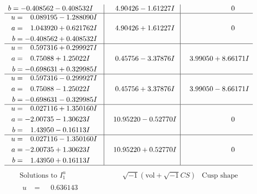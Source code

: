 \documentclass[1p]{elsarticle_modified}
\theoremstyle{definition}
\newcommand{\I}{\sqrt{-1}}
\begin{document}
$$\begin{array}{c|c|c}
\begin{aligned}
b &= -0.408562 - 0.408532 I\end{aligned}
 & \phantom{-}4.90426 - 1.61227 I & \phantom{-0.000000 } 0 \\ \hline\begin{aligned}
u &= \phantom{-}0.089195 - 1.288090 I \\
a &= \phantom{-}1.043920 + 0.621762 I \\
b &= -0.408562 + 0.408532 I\end{aligned}
 & \phantom{-}4.90426 + 1.61227 I & \phantom{-0.000000 } 0 \\ \hline\begin{aligned}
u &= \phantom{-}0.597316 + 0.299927 I \\
a &= \phantom{-}0.75088 + 1.25022 I \\
b &= -0.698631 + 0.329985 I\end{aligned}
 & \phantom{-}0.45756 - 3.37876 I & \phantom{-}3.99050 + 8.66171 I \\ \hline\begin{aligned}
u &= \phantom{-}0.597316 - 0.299927 I \\
a &= \phantom{-}0.75088 - 1.25022 I \\
b &= -0.698631 - 0.329985 I\end{aligned}
 & \phantom{-}0.45756 + 3.37876 I & \phantom{-}3.99050 - 8.66171 I \\ \hline\begin{aligned}
u &= \phantom{-}0.027116 + 1.350160 I \\
a &= -2.00735 - 1.30623 I \\
b &= \phantom{-}1.43950 - 0.16113 I\end{aligned}
 & \phantom{-}10.95220 - 0.52770 I & \phantom{-0.000000 } 0 \\ \hline\begin{aligned}
u &= \phantom{-}0.027116 - 1.350160 I \\
a &= -2.00735 + 1.30623 I \\
b &= \phantom{-}1.43950 + 0.16113 I\end{aligned}
 & \phantom{-}10.95220 + 0.52770 I & \phantom{-0.000000 } 0\\
 \hline 
 \end{array}$$\newpage$$\begin{array}{c|c|c}  
\text{Solutions to }I^u_{1}& \I (\text{vol} + \sqrt{-1}CS) & \text{Cusp shape}\\
 \hline 
\begin{aligned}
u &= \phantom{-}0.636143\phantom{ +0.000000I} \\

\end{aligned}
\end{array}$$
\end{document}

